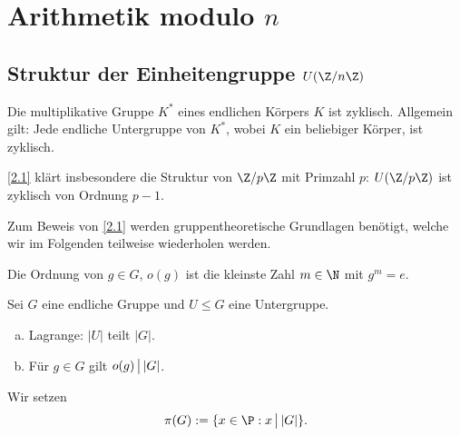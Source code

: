 \chapter{Arithmetik modulo \texorpdfstring{$n$}{n}}



\section{Struktur der Einheitengruppe \texorpdfstring{$U(\Z / n\Z)$}{U(ℤ/nℤ)}}


\begin{st} \label{2.1}
	Die multiplikative Gruppe $K^*$ eines endlichen Körpers $K$ ist zyklisch.
	Allgemein gilt: Jede endliche Untergruppe von $K^*$, wobei $K$ ein beliebiger Körper, ist zyklisch.
	\begin{note}
		\ref{2.1} klärt insbesondere die Struktur von $\Z / p\Z$ mit Primzahl $p$: $U(\Z / p\Z)$ ist zyklisch von Ordnung $p - 1$.

		Zum Beweis von \ref{2.1} werden gruppentheoretische Grundlagen benötigt, welche wir im Folgenden teilweise wiederholen werden.
	\end{note}
\end{st}

\begin{df*}
	Die Ordnung von $g \in G$, $o(g)$ ist die kleinste Zahl $m \in \N$ mit $g^m = e$.
\end{df*}

\begin{st} \label{2.2}
	Sei $G$ eine endliche Gruppe und $U \le G$ eine Untergruppe.
	\begin{enumerate}[a)]
		\item
			Lagrange: $|U|$ teilt $|G|$.
		\item
			Für $g \in G$ gilt $o(g) \divs |G|$.
	\end{enumerate}
\end{st}

\begin{df*}
	Wir setzen
	\[
		\pi(G) := \{ x \in \P : x \divs |G| \}.
	\]
\end{df*}

